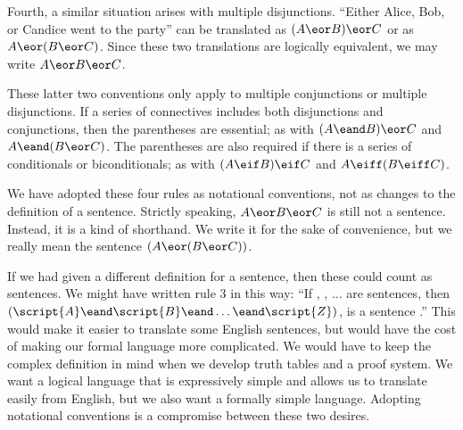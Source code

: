 Fourth, a similar situation arises with multiple disjunctions. ``Either Alice, Bob, or Candice went to the party'' can be translated as $(A \eor B) \eor C$ or as $A \eor (B \eor C)$. Since these two translations are logically equivalent, we may write $A \eor B \eor C$.

These latter two conventions only apply to multiple conjunctions or multiple  disjunctions. If a series of connectives includes both disjunctions and conjunctions, then the parentheses are essential; as with $(A \eand B) \eor C$ and $A \eand (B \eor C)$. The parentheses are also required if there is a series of conditionals or biconditionals; as with $(A \eif B) \eif C$ and $A \eiff (B \eiff C)$.

We have adopted these four rules as notational conventions, not as changes to the definition of a sentence. Strictly speaking, $A \eor B \eor C$ is still not a sentence. Instead, it is a kind of shorthand. We write it for the sake of convenience, but we really mean the sentence $(A \eor (B \eor C))$.

If we had given a different definition for a sentence, then these could count as sentences. We might have written rule 3 in this way: ``If , , $\ldots$  are sentences, then $(\script{A}\eand\script{B}\eand\ldots\eand\script{Z})$, is a sentence .'' This would make it easier to translate some English sentences, but would have the cost of making our formal language more complicated. We would have to keep the complex definition in mind when we develop truth tables and a proof system. We want a logical language that is expressively simple and allows us to translate easily from English, but we also want a formally simple language. Adopting notational conventions is a compromise between these two desires.


\practiceproblems
\setlength{\parindent}{0em}

